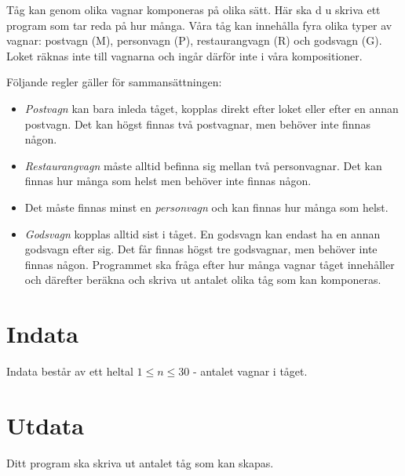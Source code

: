 
Tåg kan genom olika vagnar komponeras på olika sätt. Här ska d u skriva ett program som tar reda på hur många. Våra tåg kan innehålla fyra olika typer av vagnar: postvagn (M), personvagn (P), restaurangvagn (R) och godsvagn (G). Loket räknas inte till vagnarna och ingår därför inte i våra kompositioner.

Följande regler gäller för sammansättningen:
\begin{itemize}
\item \emph{Postvagn} kan bara inleda tåget, kopplas direkt efter loket eller efter en annan postvagn. Det kan högst finnas två postvagnar, men behöver inte finnas någon.
\item \emph{Restaurangvagn} måste alltid befinna sig mellan två personvagnar. Det kan finnas hur många som helst men behöver inte finnas någon. 	
\item Det måste finnas minst en \emph{personvagn} och kan finnas hur många som helst.
\item \emph{Godsvagn} kopplas alltid sist i tåget. En godsvagn kan endast ha en annan godsvagn efter sig. Det får finnas högst tre godsvagnar, men behöver inte finnas någon. Programmet ska fråga efter hur många vagnar tåget innehåller och därefter beräkna och skriva ut antalet olika tåg som kan komponeras. 
\end{itemize}

\section*{Indata}
Indata består av ett heltal $1 \le n \le 30$ - antalet vagnar i tåget.

\section*{Utdata}
Ditt program ska skriva ut antalet tåg som kan skapas.

